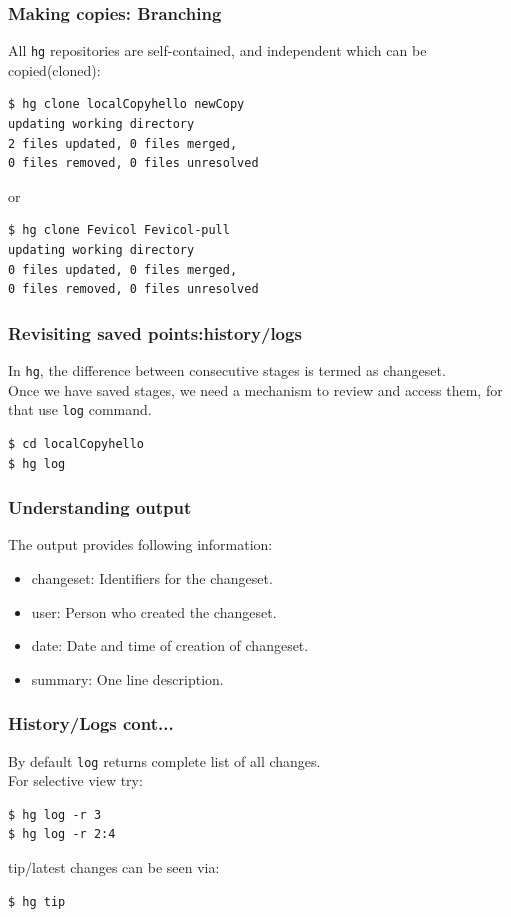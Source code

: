 \documentclass[14pt,compress]{beamer}
\newcounter{time}
\newcommand{\inctime}[1]{\addtocounter{time}{#1}{\tiny \thetime\ m}}
\newcommand{\typ}[1]{\lstinline{#1}}
\begin{document}
\begin{frame}[fragile]
  \frametitle{Making copies: Branching}
  All \typ{hg} repositories are self-contained, and independent which can be copied(cloned):
  \begin{lstlisting}
$ hg clone localCopyhello newCopy
updating working directory
2 files updated, 0 files merged, 
0 files removed, 0 files unresolved
  \end{lstlisting}
  or
  \begin{lstlisting}
$ hg clone Fevicol Fevicol-pull
updating working directory
0 files updated, 0 files merged, 
0 files removed, 0 files unresolved
  \end{lstlisting}
  \inctime{20}
\end{frame}

\begin{frame}[fragile]
  \frametitle{Revisiting saved points:history/logs}
  In \typ{hg}, the difference between consecutive stages is termed as changeset.\\
  Once we have saved stages, we need a mechanism to review and access them, for that use \typ{log} command.
  \begin{lstlisting}
$ cd localCopyhello
$ hg log    
  \end{lstlisting}
\end{frame}

\begin{frame}[fragile]
  \frametitle{Understanding output}
  The output provides following information:
  \begin{itemize}
  \item changeset: Identifiers for the changeset.
  \item user: Person who created the changeset.
  \item date: Date and time of creation of changeset.
  \item summary: One line description.
  \end{itemize}
\end{frame}

\begin{frame}[fragile]
  \frametitle{History/Logs cont...}
  By default \typ{log} returns complete list of all changes. \\
  For selective view try:
\begin{lstlisting}
$ hg log -r 3
$ hg log -r 2:4
\end{lstlisting}
  tip/latest changes can be seen via:
  \begin{lstlisting}
$ hg tip    
  \end{lstlisting} %
  \inctime{5}
\end{frame}
\end{document}
